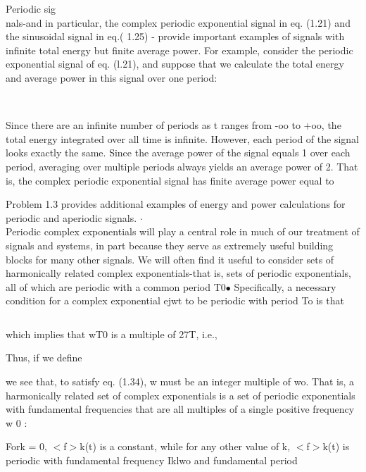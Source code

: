 \documentclass{report}
\begin{document}
Periodic sig\\
nals-and in particular, the complex periodic exponential signal in eq. (1.21) and the sinusoidal signal in eq.( 1.25) - provide important examples
of signals with infinite total energy but finite average power. For example, consider the periodic exponential signal of eq. (l.21), and suppose
that we calculate the total energy and average power in this signal over one period:

\begin{doublespace}
\noindent\(\pmb{\text{}}\)
\end{doublespace}

Since there are an infinite number of periods as t ranges from -oo to +oo, the total energy integrated over all time is infinite. However, each period
of the signal looks exactly the same. Since the average power of the signal equals 1 over each period, averaging over multiple periods always yields
an average power of 2. That is, the complex periodic exponential signal has finite average power equal to



Problem 1.3 provides additional examples of energy and power calculations for periodic and aperiodic signals. $\cdot $\\
Periodic complex exponentials will play a central role in much of our treatment of signals and systems, in part because they serve as extremely useful
building blocks for many other signals. We will often find it useful to consider sets of harmonically related complex exponentials-that is, sets
of periodic exponentials, all of which are periodic with a common period T0$\bullet $ Specifically, a necessary condition for a complex exponential
ejwt to be periodic with period To is that

\begin{equation}
\text{}
\end{equation}

which implies that wT0 is a multiple of 27T, i.e.,



Thus, if we define



we see that, to satisfy eq. (1.34), w must be an integer multiple of wo. That is, a harmonically related set of complex exponentials is a set of
periodic exponentials with fundamental frequencies that are all multiples of a single positive frequency w 0 :



Fork = 0, $<$f$>$k(t) is a constant, while for any other value of k, $<$f$>$k(t) is periodic with fundamental frequency Iklwo and fundamental period
\end{document}
